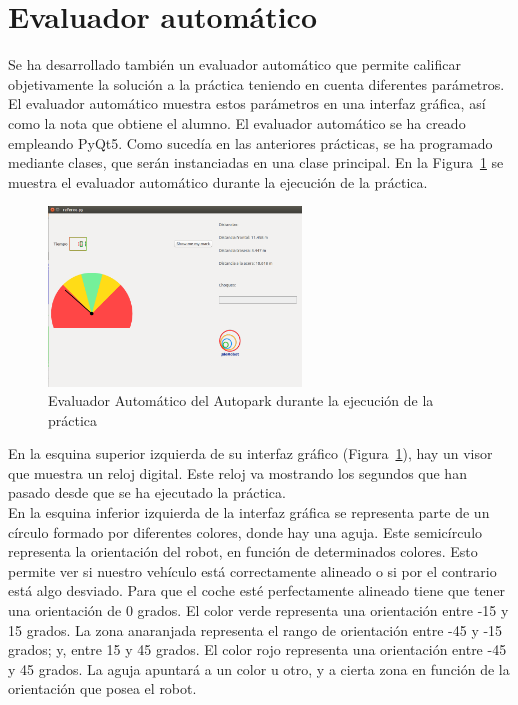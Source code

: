 \section{Evaluador automático}
Se ha desarrollado también un evaluador automático que permite calificar objetivamente la solución a la práctica teniendo en cuenta diferentes parámetros. El evaluador automático muestra estos parámetros en una interfaz gráfica, así como la nota que obtiene el alumno. El evaluador automático se ha creado empleando PyQt5. Como sucedía en las anteriores prácticas, se ha programado mediante clases, que serán instanciadas en una clase principal. En la Figura~\ref{fig.Referee_DurantePractica} se muestra el evaluador automático durante la ejecución de la práctica.

\begin{figure}[H]
  \begin{center}
    \includegraphics[width=0.6\textwidth]{figures/Autopark/Referee_DurantePractica.png}
		\caption{Evaluador Automático del Autopark durante la ejecución de la práctica}
		\label{fig.Referee_DurantePractica}
		\end{center}
\end{figure}


En la esquina superior izquierda de su interfaz gráfico (Figura~\ref{fig.Referee_DurantePractica}), hay un visor que muestra un reloj digital. Este reloj va mostrando los segundos que han pasado desde que se ha ejecutado la práctica.\\

En la esquina inferior izquierda de la interfaz gráfica se representa parte de un círculo formado por diferentes colores, donde hay una aguja. Este semicírculo representa la orientación del robot, en función de determinados colores. Esto permite ver si nuestro vehículo está correctamente alineado o si por el contrario está algo desviado. Para que el coche esté perfectamente alineado tiene que tener una orientación de 0 grados. El color verde representa una orientación entre -15 y 15 grados. La zona anaranjada representa el rango de orientación entre -45 y -15 grados; y, entre 15 y 45 grados. El color rojo representa una orientación entre -45 y 45 grados. La aguja apuntará a un color u otro, y a cierta zona en función de la orientación que posea el robot.\\


